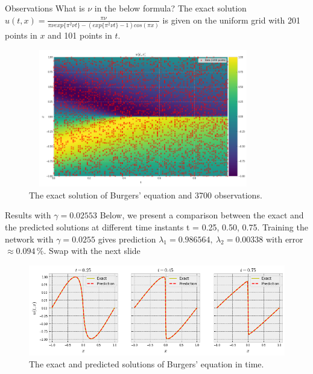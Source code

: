 \documentclass{beamer}
\def\texttt#1{<#1>}%
\begin{document}
\begin{frame}{Observations}
\small
{\color{red}What is $\nu$ in the below formula?}
The exact solution $u(t, x) = \frac{\pi \nu}{\pi \nu exp{\{\pi^2 \nu t\}} - (exp{\{\pi^2 \nu t\}} - 1) cos(\pi x)}$ is given on the uniform grid with 201 points in $x$ and 101 points in $t$. 
\begin{figure}
    \centering
    \includegraphics[width=10cm, height=6cm]{images/burgers-exact.png}
    \caption{The exact solution of Burgers' equation and 3700 observations.}
    \label{fig:my_label}
\end{figure}

\centering
\end{frame}

\begin{frame}{Results with $\gamma=0.02553$}
Below, we present a comparison between the exact and the predicted solutions at different time instants t = 0.25, 0.50, 0.75. Training the network with $\gamma=0.0255$ gives prediction $\lambda_1 =
0.986564, ~ \lambda_2 = 0.00338$ with error $\approx 0.094 \,\%$.
{\color{red}Swap with the next slide}

\begin{figure}
    \centering
    \includegraphics[scale=0.43]{images/burgers-exact-predict.png}
    \caption{The exact and predicted solutions of Burgers' equation in time.}
    \label{fig:burgers-exact-predict}
\end{figure}

\end{frame}
\end{document}
